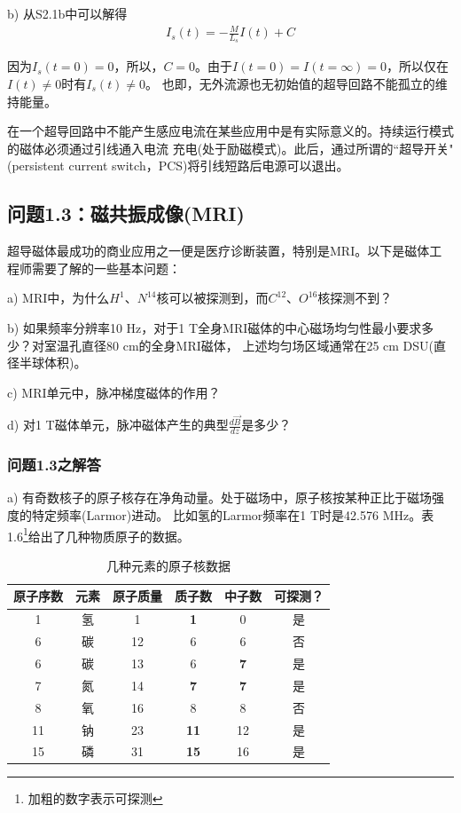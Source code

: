 b) 从S2.1b中可以解得
\begin{align*}
I_s(t) = −\frac{M}{L_s}I(t) + C\tag{S2.2}
\end{align*}

因为$I_s(t=0)=0$，所以，$C=0$。由于$I(t=0)=I(t=\infty)=0$，所以仅在$I(t)\neq 0$时有$I_s(t)\neq 0$。
也即，无外流源也无初始值的超导回路不能孤立的维持能量。

在一个超导回路中不能产生感应电流在某些应用中是有实际意义的。持续运行模式的磁体必须通过引线通入电流
充电(处于励磁模式)。此后，通过所谓的``超导开关"(persistent current switch，PCS)将引线短路后电源可以退出。


\subsection{问题1.3：磁共振成像(MRI)}
超导磁体最成功的商业应用之一便是医疗诊断装置，特别是MRI。以下是磁体工程师需要了解的一些基本问题：

a) MRI中，为什么$H^1$、$N^{14}$核可以被探测到，而$C^{12}$、$O^{16}$核探测不到？

b) 如果频率分辨率10 Hz，对于1 T全身MRI磁体的中心磁场均匀性最小要求多少？对室温孔直径80 cm的全身MRI磁体，
上述均匀场区域通常在25 cm DSU(直径半球体积)。

c) MRI单元中，脉冲梯度磁体的作用？

d) 对1 T磁体单元，脉冲磁体产生的典型$\frac{d\vec{B}}{dz}$是多少？

\subsubsection{问题1.3之解答}
a) 有奇数核子的原子核存在净角动量。处于磁场中，原子核按某种正比于磁场强度的特定频率(Larmor)进动。
比如氢的Larmor频率在1 T时是42.576 MHz。表1.6\footnote{加粗的数字表示可探测}给出了几种物质原子的数据。
\begin{table}[htbp]\small
  \centering
  \caption{几种元素的原子核数据} \label{tb:atomic}
\begin{tabular}{|c|c|c|c|c|c|}
  \hline
原子序数&元素&原子质量&质子数&中子数&可探测？ \\ \hline \hline
1&氢&1&\textbf{1}&0&是 \\ \hline
6&碳&12&6&6&否 \\ \hline
6&碳&13&6&\textbf{7}&是 \\ \hline
7&氮&14&\textbf{7}&\textbf{7}&是 \\ \hline
8&氧&16&8&8&否 \\ \hline
11&钠&23&\textbf{11}&12&是 \\ \hline
15&磷&31&\textbf{15}&16&是 \\ \hline
\end{tabular}
\end{table}

